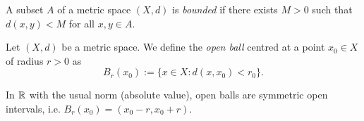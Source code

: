 \documentclass{article}
\begin{document}
\begin{definition}
A subset $A$ of a metric space $(X,d)$ is \emph{bounded} if there exists $M>0$ such that $d(x,y) < M$ for all $x,y \in A$. 
\end{definition}

\begin{definition}
Let $(X,d)$ be a metric space. We define the \emph{open ball} centred at a point $x_0 \in X$ of radius $r > 0$ as
\begin{equation*}
    B_r(x_0) := \{x \in X : d(x,x_0) < r_0 \}.
\end{equation*}
\end{definition}

\begin{example}
In ${\mathbb{R}}$ with the usual norm (absolute value), open balls are symmetric open intervals, i.e. $B_r(x_0) = (x_0-r,x_0+r)$.
\end{example}
\end{document}
